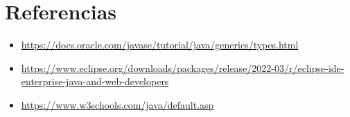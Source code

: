 \documentclass{article}
\begin{document}
\clearpage

\section{Referencias}
\begin{itemize}			
	\item \url{https://docs.oracle.com/javase/tutorial/java/generics/types.html}
	\item \url{https://www.eclipse.org/downloads/packages/release/2022-03/r/eclipse-ide-enterprise-java-and-web-developers}
	\item \url{https://www.w3schools.com/java/default.asp}
\end{itemize}	
	
%
%
%
			
\end{document}
